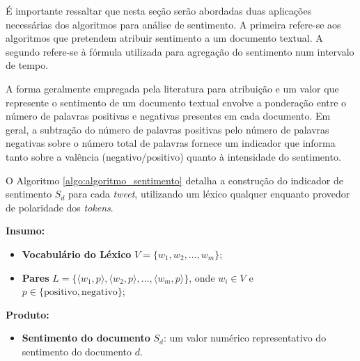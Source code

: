 É importante ressaltar que nesta seção serão abordadas duas aplicações necessárias dos algoritmos para análise de sentimento. A primeira refere-se aos algoritmos que pretendem atribuir sentimento a um documento textual. A segundo refere-se à fórmula utilizada para agregação do sentimento num intervalo de tempo. 

A forma geralmente empregada pela literatura para atribuição e um valor que represente o sentimento de um documento textual envolve a ponderação entre o número de palavras positivas e negativas presentes em cada documento. Em geral, a subtração do número de palavras positivas pelo número de palavras negativas sobre o número total de palavras fornece um indicador que informa tanto sobre a valência (negativo/positivo) quanto à intensidade do sentimento. 

O Algoritmo \ref{algo:algoritmo_sentimento} detalha a construção do indicador de sentimento \(S_d\) para cada \textit{tweet}, utilizando um léxico qualquer enquanto provedor de polaridade dos \textit{tokens}. 

\bigskip
\textbf{Insumo:}
\begin{itemize}
    \item \textbf{Vocabulário do Léxico} \( V = \{w_1, w_2, \ldots, w_m\} \);
    \item \textbf{Pares} \( L = \{\langle w_1, p\rangle, \langle w_2, p\rangle, \ldots, \langle w_m, p\rangle\} \), onde \( w_i \in V \) e \( p \in \{\text{positivo}, \text{negativo}\} \);
\end{itemize}

\textbf{Produto:}
\begin{itemize}
    \item \textbf{Sentimento do documento} \( S_d \): um valor numérico representativo do sentimento do documento \(d\).
\end{itemize}

